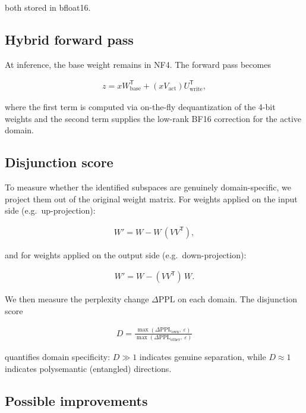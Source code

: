 \documentclass[11pt,a4paper]{article}
\begin{document}
both stored in bfloat16.

\subsection{Hybrid forward pass}

At inference, the base weight remains in NF4.  The forward pass becomes

\begin{align}
  z = x W_{\text{base}}^{\mathsf{T}} + (x V_{\text{act}}) U_{\text{write}}^{\mathsf{T}},
\end{align}

where the first term is computed via on-the-fly dequantization of the
4-bit weights and the second term supplies the low-rank BF16
correction for the active domain.

\subsection{Disjunction score}

To measure whether the identified subspaces are genuinely
domain-specific, we project them out of the original weight matrix.
For weights applied on the input side (e.g.\ up-projection):

\begin{align}
  W' = W - W\,(V V^{\mathsf{T}}),
\end{align}

and for weights applied on the output side (e.g.\ down-projection):

\begin{align}
  W' = W - (V V^{\mathsf{T}})\, W.
\end{align}

We then measure the perplexity change $\Delta\text{PPL}$ on each domain.
The disjunction score

\begin{align}
  D = \frac{\max(\Delta\text{PPL}_{\text{own}},\ \varepsilon)}
           {\max(\Delta\text{PPL}_{\text{other}},\ \varepsilon)}
\end{align}

quantifies domain specificity: $D \gg 1$ indicates genuine separation,
while $D \approx 1$ indicates polysemantic (entangled) directions.

\subsection{Possible improvements}
\end{document}
